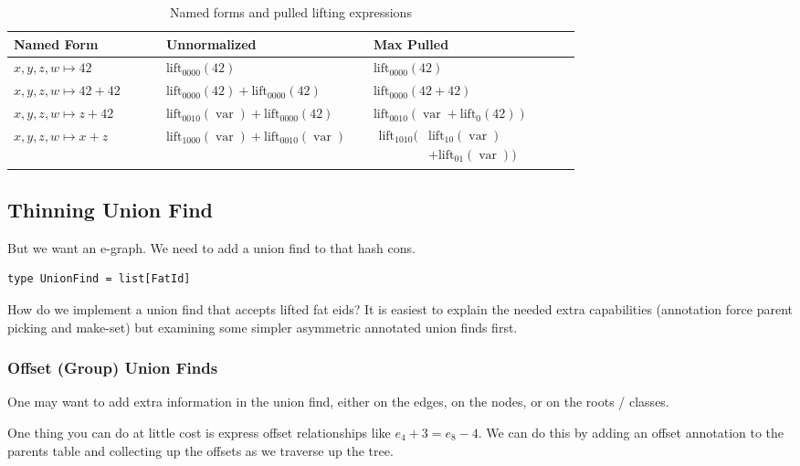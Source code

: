 \documentclass{article}%
\newcommand{\lift}{\text{lift}}
\begin{document}
\begin{table}[htbp]
\centering
\small
\renewcommand{\arraystretch}{1.4}
\begin{tabular}{p{0.25\linewidth}p{0.34\linewidth}p{0.34\linewidth}}
\hline
Named Form & Unnormalized & Max Pulled \\
\hline
$x,y,z,w \mapsto 42$
&
$\lift_{0000}(42)$
&
$\lift_{0000}(42)$
\\
$x,y,z,w \mapsto 42 + 42$
&
$\lift_{0000}(42) + \lift_{0000}(42)$
&
$\lift_{0000}(42 + 42)$
\\
$x,y,z,w \mapsto z + 42$
&
$\lift_{0010}(\operatorname{var}) + \lift_{0000}(42)$
&
$\lift_{0010}(\operatorname{var} + \lift_0(42))$
\\
$x,y,z,w \mapsto x + z$
&
$\lift_{1000}(\operatorname{var}) + \lift_{0010}(\operatorname{var})$
&
$\begin{aligned}
\lift_{1010}(&\lift_{10}(\operatorname{var}) \\
&+ \lift_{01}(\operatorname{var}))
\end{aligned}$
\\
\hline
\end{tabular}
\caption{Named forms and pulled lifting expressions}
\label{tab:named-forms}
\end{table}

\subsection{Thinning Union Find}

But we want an e-graph. We need to add a union find to that hash cons.

\begin{lstlisting}
type UnionFind = list[FatId]
\end{lstlisting}

How do we implement a union find that accepts lifted fat eids? It is easiest to explain the needed extra capabilities (annotation force parent picking and make-set) but examining some simpler asymmetric annotated union finds first.

\subsubsection{Offset (Group) Union Finds}

One may want to add extra information in the union find, either on the edges, on the nodes, or on the roots / classes.

One thing you can do at little cost is express offset relationships like $e_4 + 3 = e_8 - 4$.  We can do this by adding an offset annotation to the parents table and collecting up the offsets as we traverse up the tree. \cite{groupuf} \cite{offset_congruence}
\end{document}
